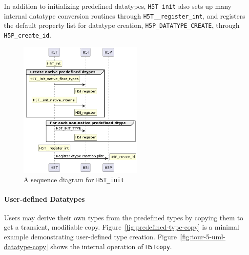 In addition to initializing predefined datatypes, \texttt{H5T\_init} also sets up many internal datatype conversion routines through \texttt{H5T\_\_register\_int}, and registers the default property list for datatype creation, \texttt{H5P\_DATATYPE\_CREATE}, through \texttt{H5P\_create\_id}.

\begin{figure}
\centering
\includegraphics[width=0.55\textwidth]{images/tour_5_uml_h5t_init.png}
\caption{A sequence diagram for \texttt{H5T\_init}}
\label{fig:h5t-init-table}
\end{figure}

\paragraph{User-defined Datatypes} Users may derive their own types from the predefined types by copying them to get a transient, modifiable copy. Figure~\ref{fig:predefined-type-copy} is a minimal example demonstrating user-defined type creation. Figure~\ref{fig:tour-5-uml-datatype-copy} shows the internal operation of \texttt{H5Tcopy}.

